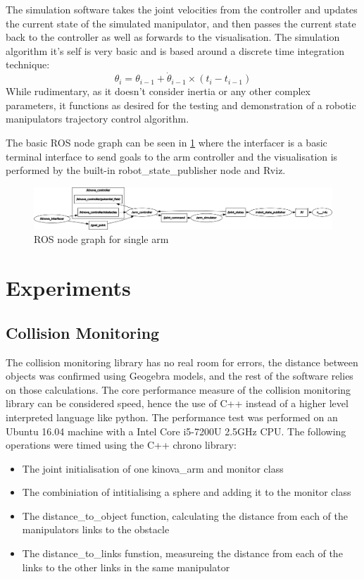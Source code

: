 \documentclass[a4paper, 10pt, conference]{ieeeconf}      %
\begin{document}
The simulation software takes the joint velocities from the controller and updates the current state of the simulated manipulator, and then passes the current state back to the controller as well as forwards to the visualisation. The simulation algorithm it's self is very basic and is based around a discrete time integration technique:
$$
\theta_i = \theta_{i-1} + \dot{\theta}_{i-1}\times (t_i - t_{i-1})
$$ 
While rudimentary, as it doesn't consider inertia or any other complex parameters, it functions as desired for the testing and demonstration of a robotic manipulators trajectory control algorithm.

The basic ROS node graph can be seen in \ref{fig:rosgraph_single} where the interfacer is a basic terminal interface to send goals to the arm controller and the visualisation is performed by the built-in robot\_state\_publisher node and Rviz.

\begin{figure}[t]
	\centering
	\includegraphics[scale=0.25]{images/rosgraph_single.png}
	\caption{ROS node graph for single arm}
	\label{fig:rosgraph_single}
\end{figure}

\section{Experiments}

\subsection{Collision Monitoring} %
The collision monitoring library has no real room for errors, the distance between objects was confirmed using Geogebra models, and the rest of the software relies on those calculations. The core performance measure of the collision monitoring library can be considered speed, hence the use of C++ instead of a higher level interpreted language like python. The performance test was performed on an Ubuntu 16.04 machine with a Intel Core i5-7200U 2.5GHz CPU. The following operations were timed using the C++ chrono library:
\begin{itemize}
	\item The joint initialisation of one kinova\_arm and monitor class
	\item The combiniation of intitialising a sphere and adding it to the monitor class
	\item The distance\_to\_object function, calculating the distance from each of the manipulators links to the obstacle
	\item The distance\_to\_links funstion, measureing the distance from each of the links to the other links in the same manipulator
\end{itemize}
\end{document}
